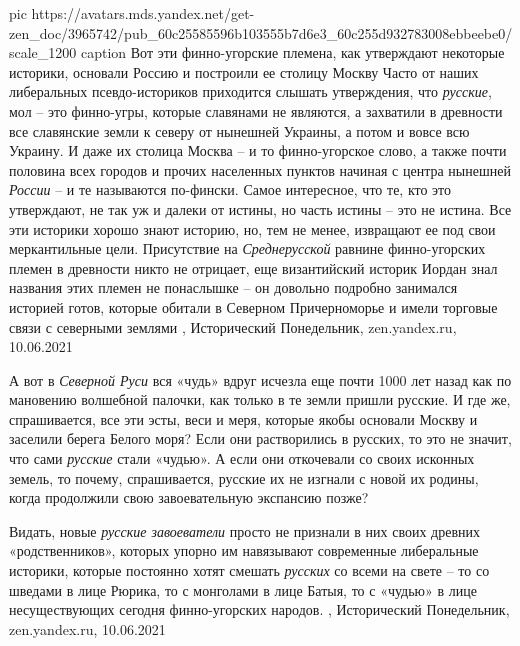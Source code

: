 \ifcmt
  pic https://avatars.mds.yandex.net/get-zen_doc/3965742/pub_60c25585596b103555b7d6e3_60c255d932783008ebbeebe0/scale_1200
  caption Вот эти финно-угорские племена, как утверждают некоторые историки, основали Россию и построили ее столицу Москву
\fi
Часто от наших либеральных псевдо-историков приходится слышать утверждения, что
\emph{русские}, мол – это финно-угры, которые славянами не являются, а
захватили в древности все славянские земли к северу от нынешней Украины, а
потом и вовсе всю Украину. И даже их столица Москва – и то финно-угорское
слово, а также почти половина всех городов и прочих населенных пунктов начиная
с центра нынешней \emph{России} – и те называются по-фински.  Самое интересное,
что те, кто это утверждают, не так уж и далеки от истины, но часть истины – это
не истина. Все эти историки хорошо знают историю, но, тем не менее, извращают
ее под свои меркантильные цели. Присутствие на \emph{Среднерусской} равнине
финно-угорских племен в древности никто не отрицает, еще византийский историк
Иордан знал названия этих племен не понаслышке – он довольно подробно занимался
историей готов, которые обитали в Северном Причерноморье и имели торговые связи
с северными землями
, 
Исторический Понедельник, zen.yandex.ru, 10.06.2021

А вот в \emph{Северной Руси} вся «чудь» вдруг исчезла еще почти 1000 лет назад
как по мановению волшебной палочки, как только в те земли пришли русские. И где
же, спрашивается, все эти эсты, веси и меря, которые якобы основали Москву и
заселили берега Белого моря? Если они растворились в русских, то это не значит,
что сами \emph{русские} стали «чудью». А если они откочевали со своих исконных земель,
то почему, спрашивается, русские их не изгнали с новой их родины, когда
продолжили свою завоевательную экспансию позже?

Видать, новые \emph{русские завоеватели} просто не признали в них своих древних
«родственников», которых упорно им навязывают современные либеральные историки,
которые постоянно хотят смешать \emph{русских} со всеми на свете – то со
шведами в лице Рюрика, то с монголами в лице Батыя, то с «чудью» в лице
несуществующих сегодня финно-угорских народов.
, 
Исторический Понедельник, zen.yandex.ru, 10.06.2021

